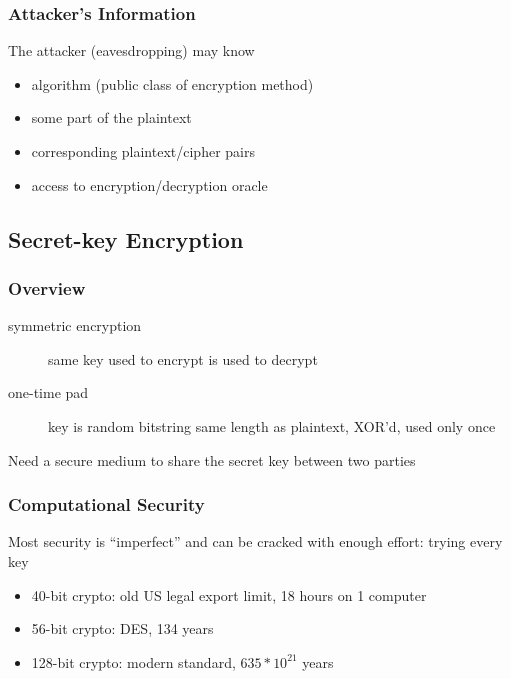 \documentclass[]{article}
\theoremstyle{definition}
\begin{document}
	\subsubsection{Attacker's Information}
	The attacker (eavesdropping) may know
	\begin{itemize}
		\item algorithm (public class of encryption method)
		\item some part of the plaintext
		\item corresponding plaintext/cipher pairs
		\item access to encryption/decryption oracle
	\end{itemize}
	
	\subsection{Secret-key Encryption}
	\subsubsection{Overview}
	\begin{description}
		\item[symmetric encryption] same key used to encrypt is used to decrypt
		\item[one-time pad] key is random bitstring same length as plaintext, XOR'd, used only once
	\end{description}
	Need a secure medium to share the secret key between two parties

	\subsubsection{Computational Security}
	Most security is ``imperfect'' and can be cracked with enough effort: trying every key
	\begin{itemize}
		\item 40-bit crypto: old US legal export limit, 18 hours on 1 computer
		\item 56-bit crypto: DES, 134 years
		\item 128-bit crypto: modern standard, $635*10^{21}$ years
	\end{itemize}
\end{document}
